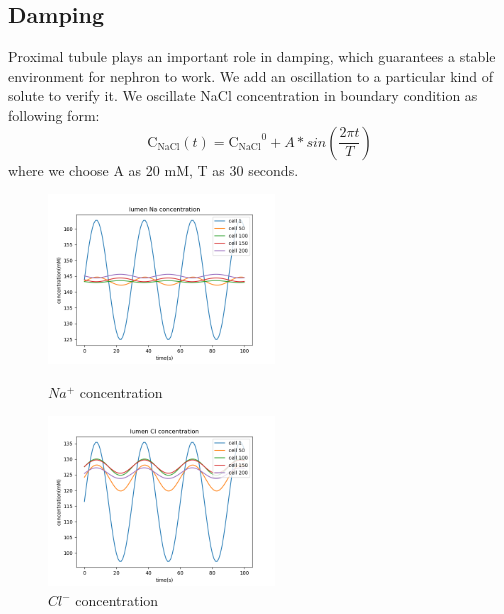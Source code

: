 \documentclass{article}
\begin{document}
\subsection{Damping}
Proximal tubule plays an important role in damping, which guarantees a stable environment for nephron to work. We add an oscillation to a particular kind of solute to verify it. We oscillate NaCl concentration in boundary condition as following form:
\begin{equation}
\mathrm{C_{NaCl}}(t)=\mathrm{C_{NaCl}}^{0}+A*sin(\frac{2\pi t}{T})
\end{equation} 
where we choose A as 20 mM, T as 30 seconds.
\begin{figure}[H]
\centering
\begin{minipage}[t]{0.48\textwidth}
\centering
\includegraphics[width=6cm]{figure/figure9.png}
\caption{$Na^{+}$ concentration}
\end{minipage}
\begin{minipage}[t]{0.48\textwidth}
\centering
\includegraphics[width=6cm]{figure/figure10.png}
\caption{$Cl^{-}$ concentration}
\end{minipage}
\end{figure}
\end{document}
